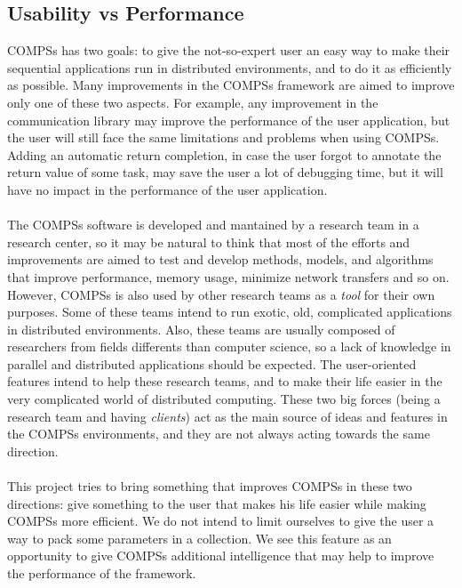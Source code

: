 \subsection{Usability vs Performance}
\label{subsec:compss_ux_vs_perf}
COMPSs has two goals: to give the not-so-expert user an easy way to make their sequential applications run in distributed environments, and to do it as efficiently as possible. Many improvements in the COMPSs framework are aimed to improve only one of these two aspects. For example, any improvement in the communication library may improve the performance of the user application, but the user will still face the same limitations and problems when using COMPSs. Adding an automatic return completion, in case the user forgot to annotate the return value of some task, may save the user a lot of debugging time, but it will have no impact in the performance of the user application.\\
\\
The COMPSs software is developed and mantained by a research team in a research center, so it may be natural to think that most of the efforts and improvements are aimed to test and develop methods, models, and algorithms that improve performance, memory usage, minimize network transfers and so on. However, COMPSs is also used by other research teams as a \textit{tool} for their own purposes. Some of these teams intend to run exotic, old, complicated applications in distributed environments. Also, these teams are usually composed of researchers from fields differents than computer science, so a lack of knowledge in parallel and distributed applications should be expected. The user-oriented features intend to help these research teams, and to make their life easier in the very complicated world of distributed computing. These two big forces (being a research team and having \textit{clients}) act as the main source of ideas and features in the COMPSs environments, and they are not always acting towards the same direction.\\
\\
This project tries to bring something that improves COMPSs in these two directions: give something to the user that makes his life easier while making COMPSs more efficient. We do not intend to limit ourselves to give the user a way to pack some parameters in a collection. We see this feature as an opportunity to give COMPSs additional intelligence that may help to improve the performance of the framework.
